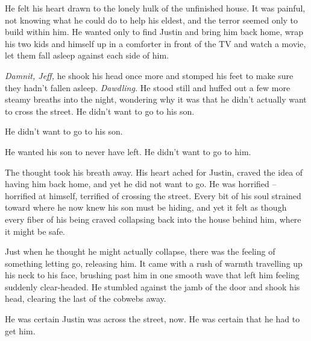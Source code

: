 He felt his heart drawn to the lonely hulk of the unfinished house.  It was painful, not knowing what he could do to help his eldest, and the terror seemed only to build within him.  He wanted only to find Justin and bring him back home, wrap his two kids and himself up in a comforter in front of the TV and watch a movie, let them fall asleep against each side of him.

\textit{Damnit, Jeff,} he shook his head once more and stomped his feet to make sure they hadn't fallen asleep.  \textit{Dawdling.}  He stood still and huffed out a few more steamy breaths into the night, wondering why it was that he didn't actually want to cross the street.  He didn't want to go to his son.

He didn't want to go to his son.

He wanted his son to never have left.  He didn't want to go to him.

The thought took his breath away.  His heart ached for Justin, craved the idea of having him back home, and yet he did not want to go.  He was horrified -- horrified at himself, terrified of crossing the street.  Every bit of his soul strained toward where he now knew his son must be hiding, and yet it felt as though every fiber of his being craved collapsing back into the house behind him, where it might be safe.

Just when he thought he might actually collapse, there was the feeling of something letting go, releasing him.  It came with a rush of warmth travelling up his neck to his face, brushing past him in one smooth wave that left him feeling suddenly clear-headed.  He stumbled against the jamb of the door and shook his head, clearing the last of the cobwebs away.

He was certain Justin was across the street, now.  He was certain that he had to get him.








